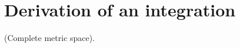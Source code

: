 \documentclass[../main.tex]{subfiles}
\begin{document}
\appendix

\chapter{Derivation of an integration} \label{apx:purification_with_noise}

\begin{definition} (Complete metric space). 
\end{definition}
\end{document}
